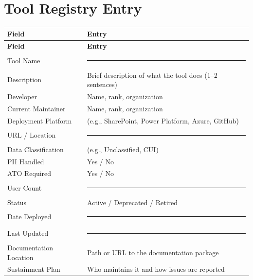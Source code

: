 \documentclass[11pt,letterpaper]{article}
\begin{document}
\newpage
\section{Tool Registry Entry}
\label{app:tool-registry-entry}

\begin{longtable}{@{}p{4.5cm}p{9cm}@{}}
\toprule
\textbf{Field} & \textbf{Entry} \\
\midrule
\endfirsthead
\toprule
\textbf{Field} & \textbf{Entry} \\
\midrule
\endhead
\bottomrule
\endlastfoot
Tool Name                & \rule{8.5cm}{0.4pt} \\
\midrule
Description              & Brief description of what the tool does (1--2 sentences) \\
\midrule
Developer                & Name, rank, organization \\
\midrule
Current Maintainer       & Name, rank, organization \\
\midrule
Deployment Platform      & (e.g., SharePoint, Power Platform, Azure, GitHub) \\
\midrule
URL / Location           & \rule{8.5cm}{0.4pt} \\
\midrule
Data Classification      & (e.g., Unclassified, CUI) \\
\midrule
PII Handled              & Yes / No \\
\midrule
ATO Required             & Yes / No \\
\midrule
User Count               & \rule{8.5cm}{0.4pt} \\
\midrule
Status                   & Active / Deprecated / Retired \\
\midrule
Date Deployed            & \rule{8.5cm}{0.4pt} \\
\midrule
Last Updated             & \rule{8.5cm}{0.4pt} \\
\midrule
Documentation Location   & Path or URL to the documentation package \\
\midrule
Sustainment Plan         & Who maintains it and how issues are reported \\
\end{longtable}

\newpage
\end{document}

